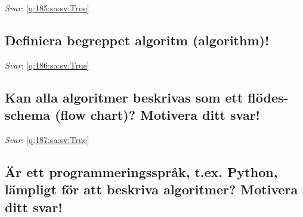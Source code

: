 \documentclass[a4paper,11pt,oneside]{article}
\begin{document}
\begin{sloppypar}
\label{q:185:sa:sv:False}

\vspace{2cm}

\noindent\makebox[\textwidth]{\hrulefill}

\vspace{1cm}

\textit{Svar}: \autoref{q:185:sa:sv:True}



\subsection{Definiera begreppet algoritm (algorithm)!}

\label{q:186:sa:sv:False}

\vspace{2cm}

\noindent\makebox[\textwidth]{\hrulefill}

\vspace{1cm}

\textit{Svar}: \autoref{q:186:sa:sv:True}



\subsection{Kan alla algoritmer beskrivas som ett fl\"odes-schema (flow chart)? Motivera ditt svar!}

\label{q:187:sa:sv:False}

\vspace{2cm}

\noindent\makebox[\textwidth]{\hrulefill}

\vspace{1cm}

\textit{Svar}: \autoref{q:187:sa:sv:True}



\subsection{\"Ar ett programmeringsspr\r{a}k, t.ex. Python, l\"ampligt f\"or att beskriva algoritmer? Motivera ditt svar!}

\label{q:188:sa:sv:False}

\vspace{2cm}

\noindent\makebox[\textwidth]{\hrulefill}

\vspace{1cm}


\end{sloppypar}
\end{document}
